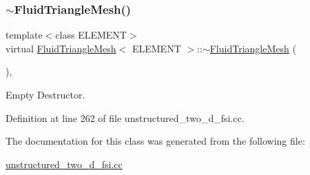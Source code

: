 \mbox{\label{classFluidTriangleMesh_adc38a903db4d9438e3cce8608f89be83}} 
\subsubsection{\texorpdfstring{$\sim$\+Fluid\+Triangle\+Mesh()}{~FluidTriangleMesh()}}
{\footnotesize\ttfamily template$<$class E\+L\+E\+M\+E\+NT$>$ \\
virtual \hyperlink{classFluidTriangleMesh}{Fluid\+Triangle\+Mesh}$<$ E\+L\+E\+M\+E\+NT $>$\+::$\sim$\hyperlink{classFluidTriangleMesh}{Fluid\+Triangle\+Mesh} (\begin{DoxyParamCaption}{ }\end{DoxyParamCaption})\hspace{0.3cm}{\ttfamily [inline]}, {\ttfamily [virtual]}}



Empty Destructor. 



Definition at line 262 of file unstructured\+\_\+two\+\_\+d\+\_\+fsi.\+cc.



The documentation for this class was generated from the following file\+:\begin{DoxyCompactItemize}
\item 
\hyperlink{unstructured__two__d__fsi_8cc}{unstructured\+\_\+two\+\_\+d\+\_\+fsi.\+cc}\end{DoxyCompactItemize}
